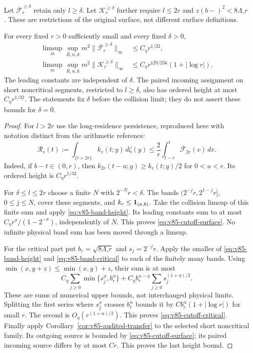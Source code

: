 Let $\overline{\mathcal F}_r^{\ge\delta}$ retain only $l\ge\delta$.
Let $\mathcal K_r^{\ge\delta}$ further require $l\le2r$ and
$z(b-)^2<8\Lambda_\circ r$. These are restrictions of the original
surface, not different surface definitions.

\begin{theorem}
\label{thm:v85-cutoff-surface}
For every fixed $r>0$ sufficiently small and every fixed $\delta>0$,
\begin{align}
 \limsup_m\sup_{R,n,k}m^2
       \|\overline{\mathcal F}_r^{\ge\delta}\|_\infty
                       &\le C_\eta r^{1/32},\label{eq:v85-cutoff-surface}\\
 \limsup_m\sup_{R,n,k}m^2\|\mathcal K_r^{\ge\delta}\|_\infty
                       &\le C_\eta r^{129/256}(1+|\log r|).
                                             \label{eq:v85-cutoff-critical}
\end{align}
The leading constants are independent of $\delta$. The paired incoming
assignment on short noncritical segments, restricted to $l\ge\delta$,
also has ordered height at most $C_\eta r^{1/32}$.
The statements fix $\delta$ before the collision limit; they do not
assert these bounds for $\delta=0$.
\end{theorem}
\begin{proof}
For $l>2r$ use the long-residence persistence, reproduced here with
notation distinct from the arithmetic reference:
\[
 \mathcal R_r(t):=\int_{\{l>2r\}}k_r(t;y)\,d\zeta(y)
       \le\frac2r\int_{t-r}^t\overline{\mathcal F}_{2r}(v)\,dv.
\]
Indeed, if $b-t\in(0,r)$, then $k_{2r}(t-u;y)\ge k_r(t;y)/2$
for $0<u<r$. Its ordered height is $C_\eta r^{1/32}$.

For $\delta\le l\le2r$ choose a finite $N$ with $2^{-N}r<\delta$.
The bands $(2^{-j}r,2^{1-j}r]$, $0\le j\le N$, cover these
segments, and $k_r\le\mathbf1_{(a,b)}$. Take the collision limsup
of this finite sum and apply \eqref{eq:v85-band-height}. Its leading
constants sum to at most
$C_\eta r^\sigma/(1-2^{-\sigma})$, independently of $N$.
This proves \eqref{eq:v85-cutoff-surface}. No infinite physical
band sum has been moved through a limsup.

For the critical part put $b_r=\sqrt{8\Lambda_\circ r}$ and
$s_j=2^{-j}r$. Apply the smaller of \eqref{eq:v85-band-height}
and \eqref{eq:v85-band-critical} to each of the finitely many bands.
Using $\min(x,y+z)\le\min(x,y)+z$, their sum is at most
\[
 C_\eta\sum_{j\ge0}\min\{s_j^\sigma,b_r^\alpha\}
       +C_\eta b_r^{\alpha-\eta}\sum_{j\ge0}s_j^{(1+\eta)/2}.
\]
These are sums of numerical upper bounds, not interchanged physical
limits. Splitting the first series where $s_j^\sigma$ crosses
$b_r^\alpha$ bounds it by
$C b_r^\alpha(1+|\log r|)$ for small $r$. The second is
$O_\eta(r^{(1+\alpha)/2})$. This proves
\eqref{eq:v85-cutoff-critical}. Finally apply
Corollary~\ref{cor:v85-audited-transfer} to the selected short
noncritical family. Its outgoing source is bounded by
\eqref{eq:v85-cutoff-surface}; its paired incoming source differs
by at most $Cr$. This proves the last height bound.
\end{proof}

